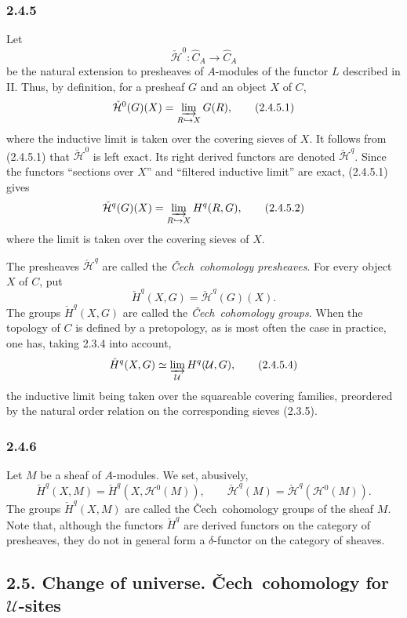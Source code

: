 \documentclass[11pt]{article}
\newcommand{\U}{\mathcal{U}}
\newcommand{\Cech}{\v{C}ech}
\newcommand{\Hh}{\mathcal{H}}
\begin{document}
\subsubsection*{2.4.5}
Let
\[
\check{\Hh}^0:\widehat C_A\longrightarrow \widehat C_A
\]
be the natural extension to presheaves of $A$-modules of the functor $L$ described in II. Thus, by definition, for a presheaf $G$ and an object $X$ of $C$,
\[
\check{\Hh}^0(G)(X)=
\varinjlim_{R\hookrightarrow X}G(R),
\tag{2.4.5.1}
\]
where the inductive limit is taken over the covering sieves of $X$. It follows from (2.4.5.1) that $\check{\Hh}^0$ is left exact. Its right derived functors are denoted $\check{\Hh}^q$. Since the functors ``sections over $X$'' and ``filtered inductive limit'' are exact, (2.4.5.1) gives
\[
\check{\Hh}^q(G)(X)=
\varinjlim_{R\hookrightarrow X}H^q(R,G),
\tag{2.4.5.2}
\]
where the limit is taken over the covering sieves of $X$.

The presheaves $\check{\Hh}^q$ are called the \emph{\Cech\ cohomology presheaves}. For every object $X$ of $C$, put
\[
\check H^q(X,G)=\check{\Hh}^q(G)(X).
\tag{2.4.5.3}
\]
The groups $\check H^q(X,G)$ are called the \emph{\Cech\ cohomology groups}. When the topology of $C$ is defined by a pretopology, as is most often the case in practice, one has, taking 2.3.4 into account,
\[
\check H^q(X,G)\simeq
\varinjlim_{\mathcal U} H^q(\mathcal U,G),
\tag{2.4.5.4}
\]
the inductive limit being taken over the squareable covering families, preordered by the natural order relation on the corresponding sieves (2.3.5).

\subsubsection*{2.4.6}
Let $M$ be a sheaf of $A$-modules. We set, abusively,
\[
\check H^q(X,M)=\check H^q(X,\Hh^0(M)),
\qquad
\check{\Hh}^q(M)=\check{\Hh}^q(\Hh^0(M)).
\tag{2.4.6.1}
\]
The groups $\check H^q(X,M)$ are called the \Cech\ cohomology groups of the sheaf $M$. Note that, although the functors $\check H^q$ are derived functors on the category of presheaves, they do not in general form a $\delta$-functor on the category of sheaves.

\subsection*{2.5. Change of universe. \Cech\ cohomology for $\U$-sites}
\end{document}
